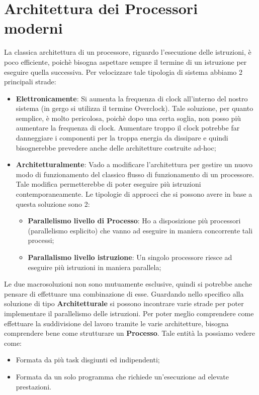 \newpage
\section{Architettura dei Processori moderni}
La classica architettura di un processore, riguardo l'esecuzione delle istruzioni, è poco efficiente, poichè bisogna aspettare sempre il termine di un istruzione per eseguire quella successiva.
Per velocizzare tale tipologia di sistema abbiamo 2 principali strade:
\begin{itemize}
    \item \textbf{Elettronicamente}: Si aumenta la frequenza di clock all'interno del nostro sistema (in gergo si utilizza il termine Overclock). Tale soluzione, per quanto semplice, è molto pericolosa, poichè dopo una certa soglia, non posso più aumentare la frequenza di clock. Aumentare troppo il clock potrebbe far danneggiare i componenti per la troppa energia da dissipare e quindi bisognerebbe prevedere anche delle architetture costruite ad-hoc;
    
    \item \textbf{Architetturalmente}: Vado a modificare l'architettura per gestire un nuovo modo di funzionamento del classico flusso di funzionamento di un processore. Tale modifica permetterebbe di poter eseguire più istruzioni contemporaneamente. Le tipologie di approcci che si possono avere in base a questa soluzione sono 2:
    \begin{itemize}
        \item \textbf{Parallelismo livello di Processo}: Ho a disposizione più processori (parallelismo esplicito) che vanno ad eseguire in maniera concorrente tali processi;
        \item \textbf{Parallalismo livello istruzione}: Un singolo processore riesce ad eseguire più istruzioni in maniera parallela;
    \end{itemize}
\end{itemize}

Le due macrosoluzioni non sono mutuamente esclusive, quindi si potrebbe anche pensare di effettuare una combinazione di esse.
Guardando nello specifico alla soluzione di tipo \textbf{Architetturale} si possono incontrare varie strade per poter implementare il parallelismo delle istruzioni.
Per poter meglio comprendere come effettuare la suddivisione del lavoro tramite le varie architetture, bisogna comprendere bene come strutturare un \textbf{Processo}. Tale entità la possiamo vedere come:
\begin{itemize}
    \item Formata da più task disgiunti ed indipendenti;
    \item Formata da un solo programma che richiede un'esecuzione ad elevate prestazioni.
\end{itemize}

